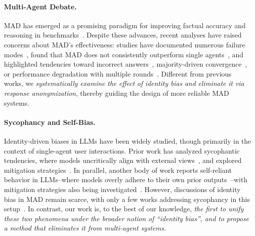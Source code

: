 \documentclass{article}
\begin{document}
\paragraph{Multi-Agent Debate.}
MAD has emerged as a promising paradigm for improving factual accuracy and reasoning in benchmarks~\citep{chanchateval, liu2024groupdebate, liu2024dynamic, li2024improving, phamlet, zhang2024cut, chen2024reconcile, liang2024encouraging, wang2024unleashing, liubreaking, chen2024optima}. Despite these advances, recent analyses have raised concerns about MAD’s effectiveness: studies have documented numerous failure modes~\citep{cemri2025multi}, found that MAD does not consistently outperform single agents~\citep{choi2025debate, zhang2025if, huanglarge, smit2024should, wang2024rethinking}, and highlighted tendencies toward incorrect answers~\citep{xiong2023examining, zhang2025if}, majority-driven convergence~\citep{estornell2024multi}, or performance degradation with multiple rounds~\citep{benedikt2025voting}. 
Different from previous works, we \emph{systematically examine the effect of identity bias and eliminate it via response anonymization}, thereby guiding the design of more reliable MAD systems.

\paragraph{Sycophancy and Self-Bias.}
Identity-driven biases in LLMs have been widely studied, though primarily in the context of single-agent user interactions. 
Prior work has analyzed sycophantic tendencies, where models uncritically align with external views~\citep{sharma2024towards,li2025truth,fanous2025syceval,liu2025truth,barkett2025reasoning,malmqvist2025sycophancy,hong2025measuring}, and explored mitigation strategies~\citep{wei2023simple,rrv2024chaos,khan2024mitigating,chen2024yes,zhang2025sycophancy}. 
In parallel, another body of work reports self-reliant behavior in LLMs--where models overly adhere to their own prior outputs~\citep{wataoka2024self,panickssery2024llm,davidson2024self,xu2024pride,spiliopoulou2025play,chen2025beyond,laurito2025ai}--with mitigation strategies also being investigated~\citep{chen2025llm,yuan2025silencer}. 
However, discussions of identity bias in MAD remain scarce, with only a few works addressing sycophancy in this setup~\citep{agarwal2025persuasion,pitre2025consensagent}. 
In contrast, our work is, to the best of our knowledge, \textit{the first to unify these two phenomena under the broader notion of ``identity bias'', and to propose a method that eliminates it from multi-agent systems.}
\end{document}
